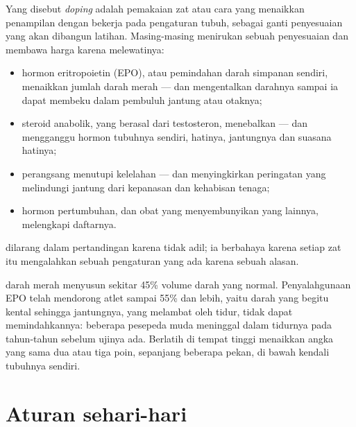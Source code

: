 \begin{proposition}[Doping]\label{prop:g10:sport-and-health:doping}
Yang disebut \emph{doping} adalah pemakaian zat atau cara
yang menaikkan penampilan dengan bekerja pada pengaturan tubuh, sebagai
ganti penyesuaian yang akan dibangun latihan. Masing-masing menirukan
sebuah penyesuaian dan membawa harga karena melewatinya:
\begin{itemize}
  \item hormon eritropoietin (EPO), atau pemindahan darah simpanan
        sendiri, menaikkan jumlah  darah merah --- dan mengentalkan
        darahnya sampai ia dapat membeku dalam pembuluh jantung atau
        otaknya;
  \item steroid anabolik, yang berasal dari testosteron, menebalkan
         --- dan mengganggu hormon tubuhnya sendiri,
        hatinya, jantungnya dan suasana hatinya;
  \item perangsang menutupi kelelahan --- dan menyingkirkan peringatan
        yang melindungi jantung dari kepanasan dan kehabisan tenaga;
  \item hormon pertumbuhan, dan obat yang menyembunyikan yang lainnya,
        melengkapi daftarnya.
\end{itemize}
 dilarang dalam pertandingan karena tidak adil; ia berbahaya
karena setiap zat itu mengalahkan sebuah pengaturan yang ada karena
sebuah alasan.
\end{proposition}
\admitted

\begin{example}\label{ex:g10:sport-and-health:epo}
 darah merah menyusun sekitar 45\% volume darah yang normal.
Penyalahgunaan EPO telah mendorong atlet sampai 55\% dan lebih, yaitu
darah yang begitu kental sehingga jantungnya, yang melambat oleh tidur,
tidak dapat memindahkannya: beberapa pesepeda muda meninggal dalam
tidurnya pada tahun-tahun sebelum ujinya ada. Berlatih di tempat tinggi
menaikkan angka yang sama dua atau tiga poin, sepanjang beberapa pekan,
di bawah kendali tubuhnya sendiri.
\end{example}

\section{Aturan sehari-hari}


